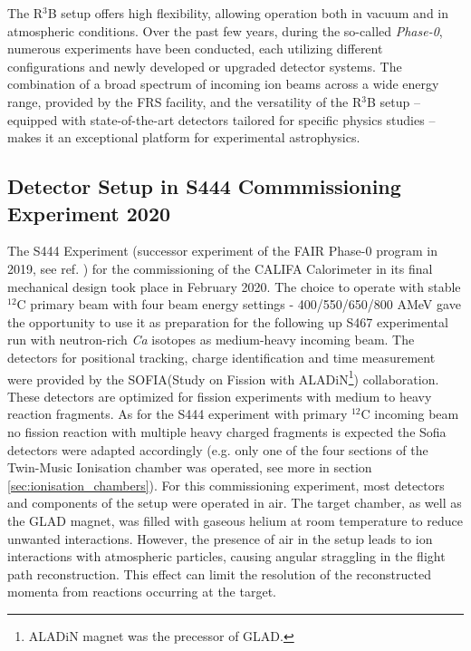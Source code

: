 The R$^3$B setup offers high flexibility, allowing operation both in vacuum and in atmospheric conditions. Over the past few years, during the so-called \textit{Phase-0}, numerous experiments have been conducted, each utilizing different configurations and newly developed or upgraded detector systems.\newline  
The combination of a broad spectrum of incoming ion beams across a wide energy range, provided by the FRS facility, and the versatility of the R$^3$B setup -- equipped with state-of-the-art detectors tailored for specific physics studies -- makes it an exceptional platform for experimental astrophysics.

\subsection{Detector Setup in S444 Commmissioning Experiment 2020}
The S444 Experiment (successor experiment of the FAIR Phase-0 program in 2019, see ref. \cite{ponnath2024measurement}) for the commissioning of the CALIFA Calorimeter in its final mechanical design took place in February 2020. The choice to operate with stable $^{12}$C primary beam with four beam energy settings - 400/550/650/800 AMeV  gave the opportunity to use it as preparation for the following up S467 experimental run with neutron-rich \textit{Ca} isotopes as medium-heavy incoming beam. The detectors for positional tracking, charge identification and time measurement were provided by the SOFIA(Study on Fission with ALADiN\footnote{ALADiN magnet was the precessor of GLAD.}) collaboration. These detectors are optimized for fission experiments with medium to heavy reaction fragments. As for the S444 experiment with primary $^{12}$C incoming beam no fission reaction with multiple heavy charged fragments is expected the Sofia detectors were adapted accordingly (e.g. only one of the four sections of the Twin-Music Ionisation chamber was operated, see more in section \ref{sec:ionisation_chambers}).\newline
For this commissioning experiment, most detectors and components of the setup were operated in air. The target chamber, as well as the GLAD magnet, was filled with gaseous helium at room temperature to reduce unwanted interactions.\newline 
However, the presence of air in the setup leads to ion interactions with atmospheric particles, causing angular straggling in the flight path reconstruction. This effect can limit the resolution of the reconstructed momenta from reactions occurring at the target.\newline


